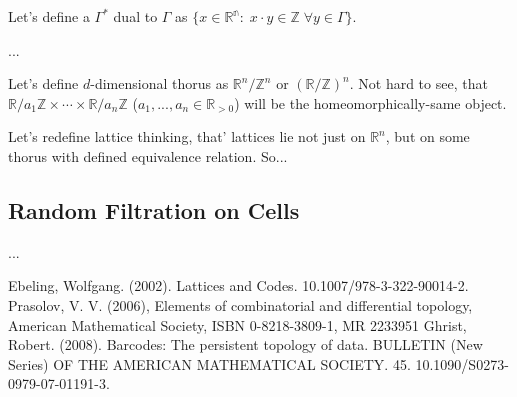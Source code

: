 \documentclass[a4paper, 12pt]{article}
\begin{document}
\par Let's define a $\Gamma^*$ dual to $\Gamma$ as $\{x\in\mathbb{R^n} :\; x\cdot y\in\mathbb{Z} \; \forall y\in\Gamma\}$.
\par ...

\par Let's define $d$-dimensional thorus as $\mathbb{R}^n/\mathbb{Z}^n$ or $\left(\mathbb{R}/\mathbb{Z}\right)^n$. Not hard to see, that $\mathbb{R}/a_1\mathbb{Z}\times\cdots\times\mathbb{R}/a_n\mathbb{Z}$ ($a_1,..., a_n\in\mathbb{R}_{>0}$) will be the homeomorphically-same object.
\par Let's redefine lattice thinking, that' lattices lie not just on $\mathbb{R}^n$, but on some thorus with defined equivalence relation. So...

\subsection{Random Filtration on Cells}
\par ...



\begin{thebibliography}{}
 Ebeling, Wolfgang. (2002). Lattices and Codes. 10.1007/978-3-322-90014-2.
  Prasolov, V. V. (2006), Elements of combinatorial and differential topology, American Mathematical Society, ISBN 0-8218-3809-1, MR 2233951
 Ghrist, Robert. (2008). Barcodes: The persistent topology of data. BULLETIN (New Series) OF THE AMERICAN MATHEMATICAL SOCIETY. 45. 10.1090/S0273-0979-07-01191-3. 
\end{thebibliography}
\end{document}
